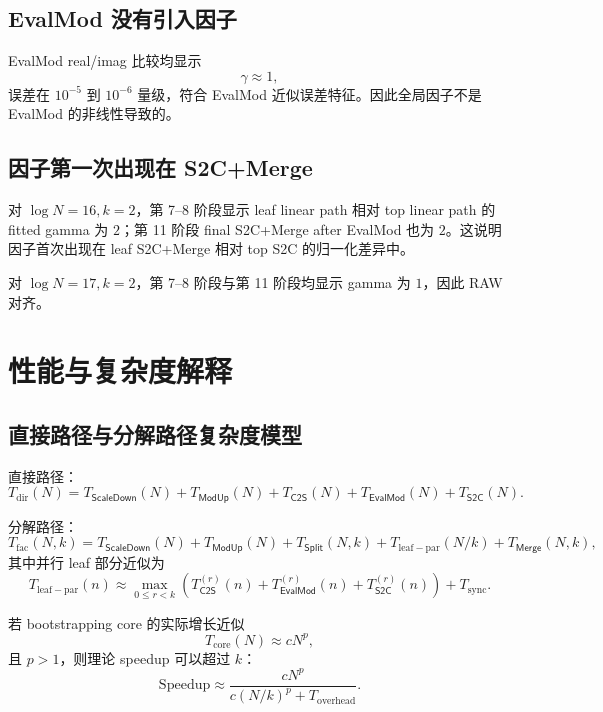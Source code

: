 \documentclass[UTF8,a4paper,11pt]{ctexart}
\newcommand{\CtwoS}{\mathsf{C2S}}
\newcommand{\StwoC}{\mathsf{S2C}}
\newcommand{\EvalMod}{\mathsf{EvalMod}}
\newcommand{\Split}{\mathsf{Split}}
\newcommand{\Merge}{\mathsf{Merge}}
\newcommand{\ScaleDown}{\mathsf{ScaleDown}}
\newcommand{\ModUp}{\mathsf{ModUp}}
\begin{document}
\subsection{EvalMod 没有引入因子}

EvalMod real/imag 比较均显示
\begin{equation}
\gamma\approx1,
\end{equation}
误差在 $10^{-5}$ 到 $10^{-6}$ 量级，符合 EvalMod 近似误差特征。因此全局因子不是 EvalMod 的非线性导致的。

\subsection{因子第一次出现在 S2C+Merge}

对 $\log N=16,k=2$，第 7--8 阶段显示 leaf linear path 相对 top linear path 的 fitted gamma 为 $2$；第 11 阶段 final S2C+Merge after EvalMod 也为 $2$。这说明因子首次出现在 leaf S2C+Merge 相对 top S2C 的归一化差异中。

对 $\log N=17,k=2$，第 7--8 阶段与第 11 阶段均显示 gamma 为 $1$，因此 RAW 对齐。

\section{性能与复杂度解释}

\subsection{直接路径与分解路径复杂度模型}

直接路径：
\begin{equation}
T_{\mathrm{dir}}(N)
=
T_{\ScaleDown}(N)+T_{\ModUp}(N)
+T_{\CtwoS}(N)+T_{\EvalMod}(N)+T_{\StwoC}(N).
\end{equation}

分解路径：
\begin{equation}
T_{\mathrm{fac}}(N,k)
=
T_{\ScaleDown}(N)+T_{\ModUp}(N)+T_{\Split}(N,k)
+T_{\mathrm{leaf-par}}(N/k)
+T_{\Merge}(N,k),
\end{equation}
其中并行 leaf 部分近似为
\begin{equation}
T_{\mathrm{leaf-par}}(n)
\approx
\max_{0\le r<k}
\left(
T_{\CtwoS}^{(r)}(n)+T_{\EvalMod}^{(r)}(n)+T_{\StwoC}^{(r)}(n)
\right)+T_{\mathrm{sync}}.
\end{equation}

若 bootstrapping core 的实际增长近似
\begin{equation}
T_{\mathrm{core}}(N)\approx cN^p,
\end{equation}
且 $p>1$，则理论 speedup 可以超过 $k$：
\begin{equation}
\mathrm{Speedup}
\approx
\frac{cN^p}{c(N/k)^p+T_{\mathrm{overhead}}}.
\end{equation}
\end{document}
